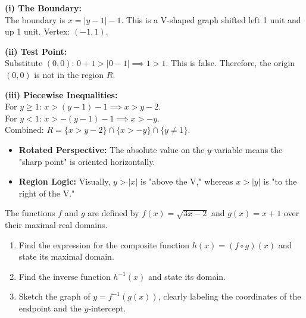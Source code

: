 \begin{solution}
\textbf{(i) The Boundary:}\\
The boundary is $x = |y - 1| - 1$. This is a V-shaped graph shifted left 1 unit and up 1 unit. Vertex: $(-1, 1)$.

\textbf{(ii) Test Point:}\\
Substitute $(0, 0)$: $0 + 1 > |0 - 1| \implies 1 > 1$. This is false. Therefore, the origin $(0, 0)$ is not in the region $R$.

\textbf{(iii) Piecewise Inequalities:}\\
For $y \ge 1$: $x > (y - 1) - 1 \implies x > y - 2$.\\
For $y < 1$: $x > -(y - 1) - 1 \implies x > -y$.\\
Combined: $R = \{x > y - 2\} \cap \{x > -y\} \cap \{y \neq 1\}$.
\end{solution}

\begin{takeaways}
\begin{itemize}[leftmargin=*]
\item \textbf{Rotated Perspective:} The absolute value on the $y$-variable means the "sharp point" is oriented horizontally. 
\item \textbf{Region Logic:} Visually, $y > |x|$ is "above the V," whereas $x > |y|$ is "to the right of the V."
\end{itemize}
\end{takeaways}

\begin{problem}
The functions $f$ and $g$ are defined by $f(x) = \sqrt{3x-2}$ and $g(x) = x+1$ over their maximal real domains. 

\begin{enumerate}[label=(\roman*)]
    \item Find the expression for the composite function $h(x) = (f \circ g)(x)$ and state its maximal domain.
    \item Find the inverse function $h^{-1}(x)$ and state its domain.
    \item Sketch the graph of $y = f^{-1}(g(x))$, clearly labeling the coordinates of the endpoint and the $y$-intercept.
\end{enumerate}
\end{problem}

